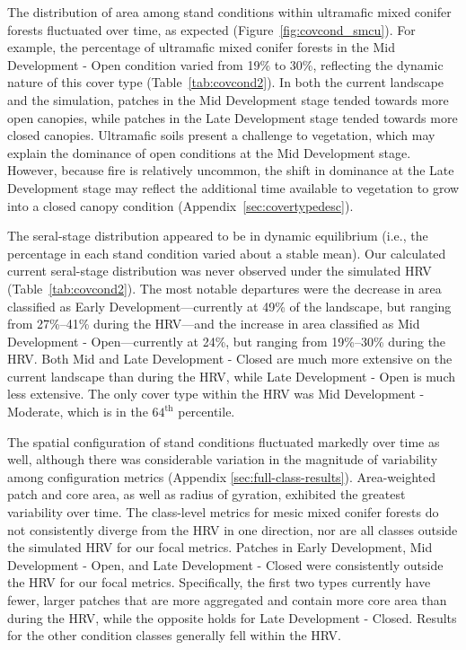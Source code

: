The distribution of area among stand conditions within ultramafic mixed conifer forests fluctuated over time, as expected (Figure~\ref{fig:covcond_smcu}). For example, the percentage of ultramafic mixed conifer forests in the Mid Development - Open condition varied from 19\% to 30\%, reflecting the dynamic nature of this cover type (Table~\ref{tab:covcond2}). In both the current landscape and the simulation, patches in the Mid Development stage tended towards more open canopies, while patches in the Late Development stage tended towards more closed canopies. Ultramafic soils present a challenge to vegetation, which may explain the dominance of open conditions at the Mid Development stage. However, because fire is relatively uncommon, the shift in dominance at the Late Development stage may reflect the additional time available to vegetation to grow into a closed canopy condition (Appendix~\ref{sec:covertypedesc}).

The seral-stage distribution appeared to be in dynamic equilibrium (i.e., the percentage in each stand condition varied about a stable mean). Our calculated current seral-stage distribution was never observed under the simulated HRV (Table~\ref{tab:covcond2}). The most notable departures were the decrease in area classified as Early Development---currently at 49\% of the landscape, but ranging from 27\%--41\% during the HRV---and the increase in area classified as Mid Development - Open---currently at 24\%, but ranging from 19\%--30\% during the HRV. Both Mid and Late Development - Closed are much more extensive on the current landscape than during the HRV, while Late Development - Open is much less extensive. The only cover type within the HRV was Mid Development - Moderate, which is in the $64^{\text{th}}$ percentile.

The spatial configuration of stand conditions fluctuated markedly over time as well, although there was considerable variation in the magnitude of variability among configuration metrics (Appendix \ref{sec:full-class-results}). Area-weighted patch and core area, as well as radius of gyration, exhibited the greatest variability over time. The class-level metrics for mesic mixed conifer forests do not consistently diverge from the HRV in one direction, nor are all classes outside the simulated HRV for our focal metrics. Patches in Early Development, Mid Development - Open, and Late Development - Closed were consistently outside the HRV for our focal metrics. Specifically, the first two types currently have fewer, larger patches that are more aggregated and contain more core area than during the HRV, while the opposite holds for Late Development - Closed. Results for the other condition classes generally fell within the HRV.

